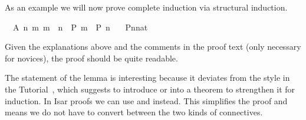 \begin{isabellebody}
\begin{isamarkuptext}
As an example we will now prove complete induction via
structural induction.%
\end{isamarkuptext}%
\isamarkuptrue%
\ \ A{\isacharcolon}\ {\isachardoublequote}{\isacharparenleft}{\isasymAnd}n{\isachardot}\ {\isacharparenleft}{\isasymAnd}m{\isachardot}\ m\ {\isacharless}\ n\ {\isasymLongrightarrow}\ P\ m{\isacharparenright}\ {\isasymLongrightarrow}\ P\ n{\isacharparenright}{\isachardoublequote}\isanewline
\ \ \ {\isachardoublequote}P{\isacharparenleft}n{\isacharcolon}{\isacharcolon}nat{\isacharparenright}{\isachardoublequote}\isanewline
\isamarkupfalse%
\isamarkupfalse%
\isamarkupfalse%
\isamarkupfalse%
\isamarkupfalse%
\isamarkupfalse%
\isamarkupfalse%
\isamarkupfalse%
\isamarkupfalse%
\isamarkupfalse%
\isamarkupfalse%
\isamarkupfalse%
\isamarkupfalse%
\isamarkupfalse%
\isamarkupfalse%
\isamarkupfalse%
\isamarkupfalse%
\isamarkupfalse%
\isamarkupfalse%
\isamarkupfalse%
\isamarkupfalse%
\isamarkupfalse%
\isamarkupfalse%
\isamarkupfalse%
\isamarkupfalse%
\isamarkupfalse%
\isamarkupfalse%
\isamarkupfalse%
%
\begin{isamarkuptext}%
\noindent Given the explanations above and the comments in the
proof text (only necessary for novices), the proof should be quite
readable.

The statement of the lemma is interesting because it deviates from the style in
the Tutorial~\cite{LNCS2283}, which suggests to introduce \isa{{\isasymforall}} or
\isa{{\isasymlongrightarrow}} into a theorem to strengthen it for induction. In Isar
proofs we can use \isa{{\isasymAnd}} and \isa{{\isasymLongrightarrow}} instead. This simplifies the
proof and means we do not have to convert between the two kinds of
connectives.


\end{isamarkuptext}
\end{isabellebody}
